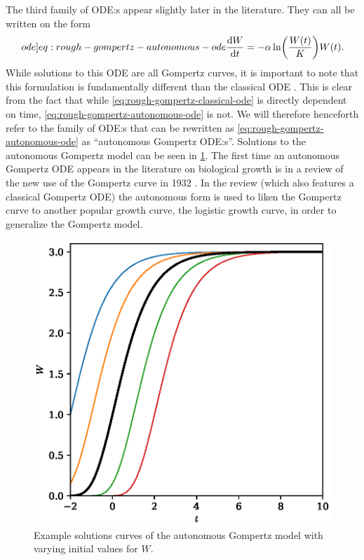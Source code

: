 The third family of ODE:s appear slightly later in the literature.
They can all be written on the form
\begin{equation} \label[ode]{eq:rough-gompertz-autonomous-ode}
  \diff{W}{t} = -\alpha \ln\left(\frac{W(t)}{K}\right) W(t).
\end{equation}
While solutions to this ODE are all Gompertz curves, it is important to note that this formulation is fundamentally different than the classical ODE .
This is clear from the fact that while \cref{eq:rough-gompertz-classical-ode} is directly dependent on time, \cref{eq:rough-gompertz-autonomous-ode} is not.
We will therefore henceforth refer to the family of ODE:s that can be rewritten as \cref{eq:rough-gompertz-autonomous-ode} as \enquote{autonomous Gompertz ODE:s}.
Solutions to the autonomous Gompertz model can be seen in \cref{fig:gompertz-autonomous-solutions}.
The first time an autonomous Gompertz ODE appears in the literature on biological growth is in a review of the new use of the Gompertz curve in 1932 \cite{winsor1932gompertz}.
In the review (which also features a classical Gompertz ODE) the autonomous form is used to liken the Gompertz curve to another popular growth curve, the logistic growth curve, in order to generalize the Gompertz model.
\begin{figure}
  \centering
  \includegraphics[width=.32\textwidth]{images/gompertz-autonomous-solutions}
  \caption{Example solutions curves of the autonomous Gompertz model with varying initial values for \(W\).}
  \label{fig:gompertz-autonomous-solutions}
\end{figure}

